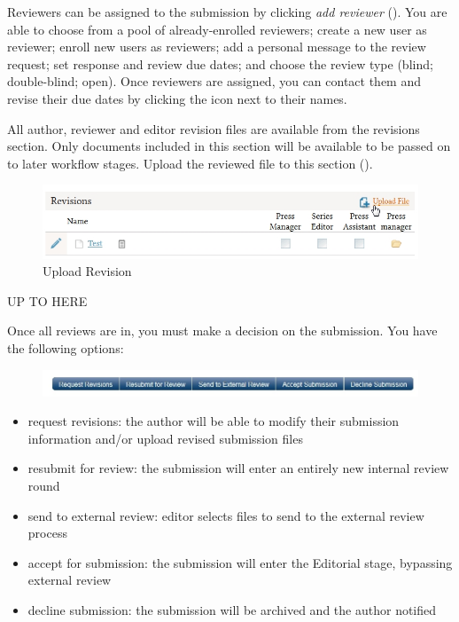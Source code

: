Reviewers can be assigned to the submission by clicking \textit{add reviewer} (). You are able to choose from a pool of already-enrolled reviewers; create a new user as reviewer; enroll new users as reviewers; add a personal message to the review request; set response and review due dates; and choose the review type (blind; double-blind; open). Once reviewers are assigned, you can contact them and revise their due dates by clicking the icon next to their names. %

All author, reviewer and editor revision files are available from the revisions section. Only documents included in this section will be available to be passed on to later workflow stages. Upload the reviewed file to this section ().

\begin{figure}[h] \centering
\includegraphics[width=1\textwidth]{./img/uploadRevision.jpg} \caption{Upload Revision}
\label{fig:uploadRevision}
\end{figure}


UP TO HERE

Once all reviews are in, you must make a decision on the submission. You have the following options: 
\begin{figure}[h] \centering
\includegraphics[width=1\textwidth]{./img/internalReview-2.jpg} 
\end{figure}
\begin{itemize}[noitemsep]
\item request revisions: the author will be able to modify their submission information and/or upload revised submission files
\item resubmit for review: the submission will enter an entirely new internal review round
\item send to external review: editor selects files to send to the external review process
\item accept for submission: the submission will enter the Editorial stage, bypassing external review
\item decline submission: the submission will be archived and the author notified
\end{itemize}

